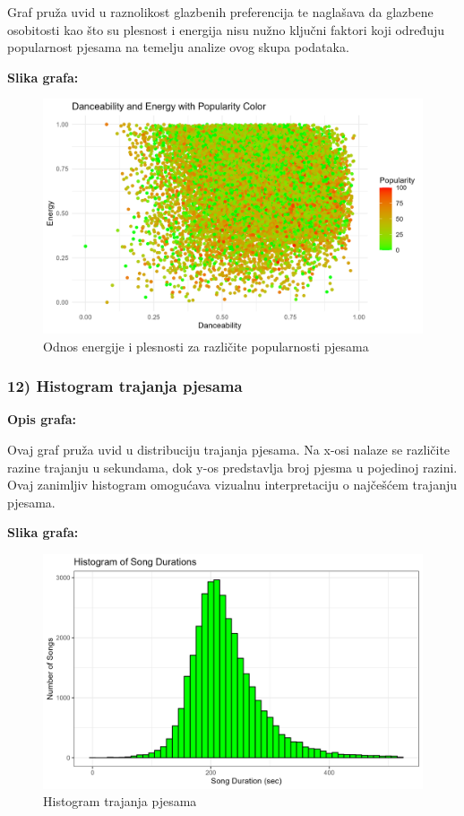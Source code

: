 	Graf pruža uvid u raznolikost glazbenih preferencija te naglašava da glazbene osobitosti kao što su plesnost i energija nisu nužno ključni faktori koji određuju popularnost pjesama na temelju analize ovog skupa podataka.
	
	\textbf{Slika grafa:}
	\begin{figure}[H]
		\includegraphics[scale=0.9]{slike/Dance-Energy-popularity.png}
		\centering
		\caption{ Odnos energije i plesnosti za različite popularnosti pjesama}
		
	\end{figure}


	\subsubsection{12) Histogram trajanja pjesama}
    
    \textbf{Opis grafa:}
    
Ovaj graf pruža uvid u distribuciju trajanja pjesama. Na x-osi nalaze se različite razine trajanju u sekundama, dok y-os predstavlja broj pjesma u pojedinoj razini. Ovaj zanimljiv histogram omogućava vizualnu interpretaciju o najčešćem trajanju pjesama.
    

    \textbf{Slika grafa:}
    \begin{figure}[H]
        \includegraphics[scale=0.9]{slike/Histogram of song durations.png}
        \centering
        \caption{Histogram trajanja pjesama}
        
    \end{figure}
    
